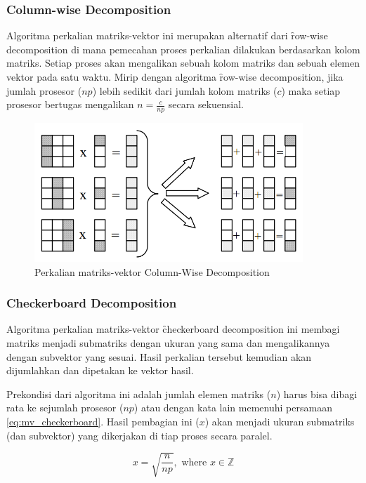 \subsubsection{Column-wise Decomposition}

Algoritma perkalian matriks-vektor ini merupakan alternatif dari \f{row-wise decomposition} di mana pemecahan proses perkalian dilakukan berdasarkan kolom matriks. Setiap proses akan mengalikan sebuah kolom matriks dan sebuah elemen vektor pada satu waktu. Mirip dengan algoritma \f{row-wise decomposition}, jika jumlah prosesor ($np$) lebih sedikit dari jumlah kolom matriks ($c$) maka setiap prosesor bertugas mengalikan $n = \frac{c}{np}$ secara sekuensial.

\begin{figure}
	\centering
	\includegraphics[width=0.9\textwidth]
	{pics/mv_colwise}
	\caption{Perkalian matriks-vektor Column-Wise Decomposition}
	\label{fig:mv_colwise}
\end{figure}  

\subsubsection{Checkerboard Decomposition}

Algoritma perkalian matriks-vektor \f{checkerboard decomposition} ini membagi matriks menjadi submatriks dengan ukuran yang sama dan mengalikannya dengan subvektor yang sesuai. Hasil perkalian tersebut kemudian akan dijumlahkan dan dipetakan ke vektor hasil.

Prekondisi dari algoritma ini adalah jumlah elemen matriks ($n$) harus bisa dibagi rata ke sejumlah prosesor ($np$) atau dengan kata lain memenuhi persamaan \ref{eq:mv_checkerboard}. Hasil pembagian ini ($x$) akan menjadi ukuran submatriks (dan subvektor) yang dikerjakan di tiap proses secara paralel.

\begin{equation}
	x = \sqrt{\frac{n}{np}},\text{ where } x \in \mathbb{Z}
	\label{eq:mv_checkerboard}
\end{equation}


